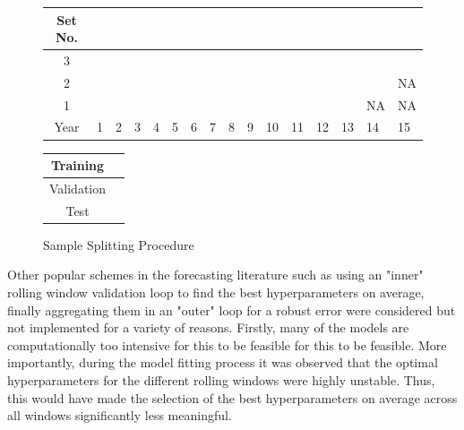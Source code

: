 \documentclass[a4paper, table]{article}
\begin{document}
\begin{figure}
	\begin{center}
		\begin{tabular}{|c|p{0.40cm}p{0.40cm}p{0.40cm}p{0.40cm}p{0.40cm}p{0.40cm}p{0.40cm}p{0.40cm}p{0.40cm}p{0.40cm}p{0.40cm}p{0.40cm}p{0.40cm}p{0.40cm}p{0.40cm}|}
			\hline
			Set No. &&&&&&&&&&&&&&& \\
			\hline
			3 & \cellcolor{cyan} & \cellcolor{cyan} & \cellcolor{cyan} & \cellcolor{cyan} & \cellcolor{cyan} & \cellcolor{cyan} & \cellcolor{cyan} & \cellcolor{cyan} & \cellcolor{cyan} &
			\cellcolor{pink} & \cellcolor{pink} & \cellcolor{pink} & \cellcolor{pink} & \cellcolor{pink} & 	
			\cellcolor{olive} \\
			2 & \cellcolor{cyan} & \cellcolor{cyan} & \cellcolor{cyan} & \cellcolor{cyan} & \cellcolor{cyan} & \cellcolor{cyan} & \cellcolor{cyan} & \cellcolor{cyan} &
			\cellcolor{pink} & \cellcolor{pink} & \cellcolor{pink} & \cellcolor{pink} & \cellcolor{pink} & 	
			\cellcolor{olive} & NA  \\
			1 & \cellcolor{cyan} & \cellcolor{cyan} & \cellcolor{cyan} & \cellcolor{cyan} & \cellcolor{cyan} & \cellcolor{cyan} & \cellcolor{cyan} &
			\cellcolor{pink} & \cellcolor{pink} & \cellcolor{pink} & \cellcolor{pink} & \cellcolor{pink} & 	
			\cellcolor{olive} & NA & NA \\
			\hline
			Year & 1 & 2 & 3 & 4 & 5 & 6 & 7 & 8 & 9 & 10 & 11 & 12 & 13 & 14 & 15\\
			\hline
		\end{tabular}
		\medskip
		\begin{tabular}{|c|p{0.40cm}|}
			\hline
			Training & \cellcolor{cyan} \\
			\hline
			Validation & \cellcolor{pink} \\
			\hline
			Test & \cellcolor{olive} \\
			\hline
		\end{tabular}
	\end{center}
	\caption{Sample Splitting Procedure}
	\label{sample_split_diag}
\end{figure}

Other popular schemes in the forecasting literature such as using an "inner" rolling window validation loop to find the best hyperparameters on average, finally aggregating them in an "outer" loop for a robust error were considered but not implemented for a variety of reasons. Firstly, many of the models are computationally too intensive for this to be feasible for this to be feasible. More importantly, during the model fitting process it was observed that the optimal hyperparameters for the different rolling windows were highly unstable. Thus, this would have made the selection of the best hyperparameters on average across all windows significantly less meaningful.
\end{document}
